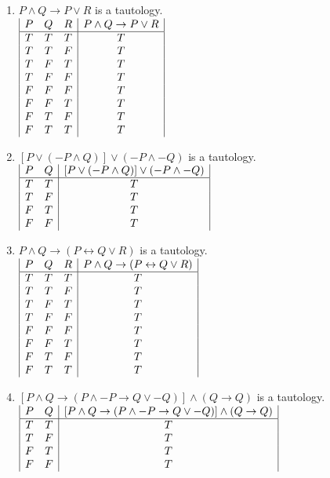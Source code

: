 \documentclass{article}
\begin{document}
\begin{enumerate}[label=(\alph*)]
\item \(P \land Q \rightarrow P \lor R\) is a tautology.\\
\(
\begin{array}{|c c c|c|}
P & Q & R & P \land Q \rightarrow P \lor R\\
\hline
T & T & T & T\\
T & T & F & T\\
T & F & T & T\\
T & F & F & T\\
F & F & F & T\\
F & F & T & T\\
F & T & F & T\\
F & T & T & T\\
\end{array}
\)
\medskip

\item \([P \lor (-P \land Q)] \lor (-P \land -Q)\) is a tautology.\\
\(
\begin{array}{|c c|c|}
P & Q & [P \lor (-P \land Q)] \lor (-P \land -Q)\\
\hline
T & T & T\\
T & F & T\\
F & T & T\\
F & F & T\\
\end{array}
\)
\medskip

\item \(P \land Q \rightarrow (P \leftrightarrow Q \lor R) \) is a tautology.\\
\(
\begin{array}{|c c c|c|}
    P & Q & R & P \land Q \rightarrow (P \leftrightarrow Q \lor R)\\
\hline
T & T & T & T\\
T & T & F & T\\
T & F & T & T\\
T & F & F & T\\
F & F & F & T\\
F & F & T & T\\
F & T & F & T\\
F & T & T & T\\
\end{array}
\)
\medskip

\item \([P \land Q \rightarrow (P \land -P \rightarrow Q \lor -Q)] \land (Q \rightarrow Q)\) is a tautology.\\
\(
\begin{array}{|c c|c|}
P & Q & [P \land Q \rightarrow (P \land -P \rightarrow Q \lor -Q)] \land (Q \rightarrow Q)\\
\hline
T & T & T\\
T & F & T\\
F & T & T\\
F & F & T\\
\end{array}
\)
\medskip
\end{enumerate}
\end{document}
